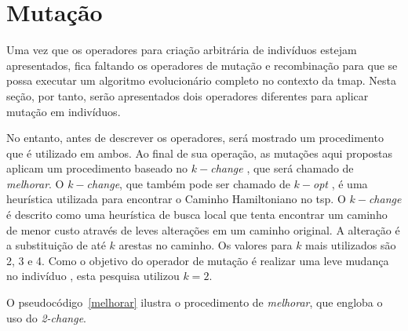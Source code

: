 \section{Mutação}

Uma vez que os operadores para criação arbitrária de indivíduos estejam 
apresentados, fica faltando os operadores de mutação e recombinação para que 
se possa executar um algoritmo evolucionário completo no contexto da \ac{tmap}.
Nesta seção, por tanto, serão apresentados dois operadores diferentes para 
aplicar mutação em indivíduos.

No entanto, antes de descrever os operadores, será mostrado um procedimento que 
é utilizado em ambos. Ao final de sua operação, as mutações aqui propostas 
aplicam um procedimento baseado no \textit{$k-$change} 
\citep{Marx:2008:SKN:2283963.2284596}, que será chamado de \textit{melhorar}. 
O \textit{$k-$change}, que também pode ser chamado de \textit{$k-$opt} 
\citep{nilsson2003heuristics}, é uma heurística utilizada para encontrar o 
Caminho Hamiltoniano no \ac{tsp}. O \textit{$k-$change} é descrito como uma 
heurística de busca local que tenta encontrar um caminho de menor custo através 
de leves alterações em um caminho original. A alteração é a substituição de até 
$k$ arestas no caminho. Os valores para $k$ mais utilizados são 2, 3 e 4. Como 
o objetivo do operador de mutação é realizar uma leve mudança no indivíduo 
\citep{Luke2013Metaheuristics}, esta pesquisa utilizou $k = 2$.

O pseudocódigo~\ref{melhorar} ilustra o procedimento de \textit{melhorar}, que 
engloba o uso do \textit{2-change}.


